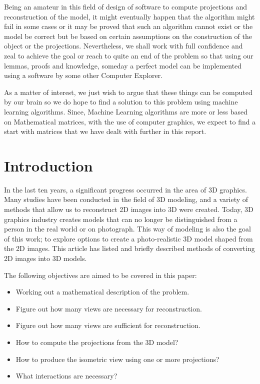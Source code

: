 \documentclass[12pt]{report}
\begin{document}
\vspace{0.2cm}

Being an amateur in this field of design of software to compute projections and reconstruction of the model, it might eventually happen that the algorithm might fail in some cases or it may be proved that such an algorithm cannot exist or the model be correct but be based on certain assumptions on the construction of the object or the projections. Nevertheless, we shall work with full confidence and zeal to achieve the goal or reach to quite an end of the problem so that using our lemmas, proofs and knowledge, someday a perfect model can be implemented using a software by some other Computer Explorer. 
\\
\vspace{0.2cm}

As a matter of interest, we just wish to argue that these things can be computed by our brain so we do hope to find a solution to this problem using machine learning algorithms. Since, Machine Learning algorithms are more or less based on Mathematical matrices, with the use of computer graphics, we expect to find a start with matrices that we have dealt with further in this report. 

\newpage

\tableofcontents

\newpage

\chapter{Introduction}

In the last ten years, a significant progress occurred in the area of 3D graphics. Many studies have been conducted in the field of 3D modeling, and a variety of methods that allow us to reconstruct 2D images into 3D were created. Today, 3D graphics industry creates models that can no longer be distinguished from a person in the real world or on photograph. This way of modeling is also the goal of this work; to explore options to create a photo-realistic 3D model shaped from the 2D images. This article has listed and briefly described methods of converting 2D images into 3D models.

\vspace{1cm}

The following objectives are aimed to be covered in this paper:

\begin{itemize}
  \item
  Working out a mathematical description of the problem.
  \item
  Figure out how many views are necessary for reconstruction.
  \item
  Figure out how many views are sufficient for reconstruction.
  \item
  How to compute the projections from the 3D model?
  \item
  How to produce the isometric view using one or more projections?
  \item
  What interactions are necessary?
  
\end{itemize}
\end{document}
